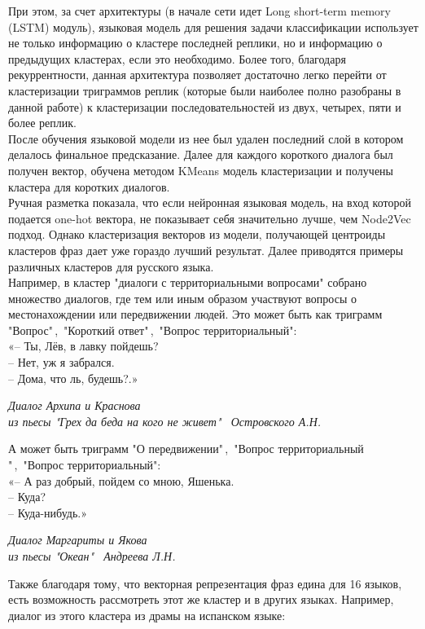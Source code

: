 \documentclass[a4paper,14pt]{article}
\begin{document}
\begin{justify}
\indent
При этом, за счет архитектуры (в начале сети идет Long short-term memory (LSTM) модуль), языковая модель для решения задачи классификации использует не только информацию о кластере последней реплики, но и информацию о предыдущих кластерах, если это необходимо. Более того, благодаря рекуррентности, данная архитектура позволяет достаточно легко перейти от кластеризации триграммов реплик (которые были наиболее полно разобраны в данной работе) к кластеризации последовательностей из двух, четырех, пяти и более реплик. \\
\indent
После обучения языковой модели из нее был удален последний слой в котором делалось финальное предсказание. Далее для каждого короткого диалога был получен вектор, обучена методом KMeans модель кластеризации и получены кластера для коротких диалогов. \\
\indent
Ручная разметка показала, что если нейронная языковая модель, на вход которой подается one-hot вектора, не показывает себя значительно лучше, чем Node2Vec подход. Однако кластеризация векторов из модели, получающей центроиды кластеров фраз дает уже гораздо лучший результат. Далее приводятся примеры различных кластеров для русского языка. \\
\indent
Например, в кластер "диалоги с территориальными вопросами" собрано множество диалогов, где тем или иным образом участвуют вопросы о местонахождении или передвижении людей. Это может быть как триграмм "Вопрос"\,,\ "Короткий ответ"\,,\ "Вопрос территориальный": \\
\indent
«-- Ты, Лёв, в лавку пойдешь? \\
\indent
-- Нет, уж я забрался. \\
\indent
-- Дома, что ль, будешь?.»
\begin{flushright}\textit{Диалог Архипа и Краснова\\из пьесы "Грех да беда на кого не живет" \ Островского А.Н.}\end{flushright}
\indent
А может быть триграмм "О передвижении"\,,\ "Вопрос территориальный "\,,\ "Вопрос территориальный": \\
\indent
«-- А раз добрый, пойдем со мною, Яшенька. \\
\indent
-- Куда? \\
\indent
-- Куда-нибудь.»
\begin{flushright}\textit{Диалог Маргариты и Якова\\из пьесы "Океан" \ Андреева Л.Н.}\end{flushright}
Также благодаря тому, что векторная репрезентация фраз  едина для 16 языков, есть возможность рассмотреть этот же кластер и в других языках. Например, диалог из этого кластера из драмы на испанском языке: \\

\end{justify}
\end{document}
